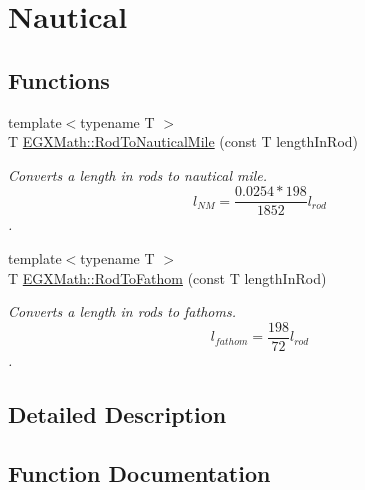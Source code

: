 \hypertarget{group___e_g_x_math-_conversions-_length_conversions-_imperial-_rod-_nautical}{}\section{Nautical}
\label{group___e_g_x_math-_conversions-_length_conversions-_imperial-_rod-_nautical}
\subsection*{Functions}
\begin{DoxyCompactItemize}
\item 
{\footnotesize template$<$typename T $>$ }\\T \mbox{\hyperlink{group___e_g_x_math-_conversions-_length_conversions-_imperial-_rod-_nautical_ga68825640131c61e55490acfcb616aa78}{E\+G\+X\+Math\+::\+Rod\+To\+Nautical\+Mile}} (const T length\+In\+Rod)
\begin{DoxyCompactList}\small\item\em Converts a length in rods to nautical mile. \[ l_{NM}= \frac{0.0254 * 198}{1852} l_{rod} \]. \end{DoxyCompactList}\item 
{\footnotesize template$<$typename T $>$ }\\T \mbox{\hyperlink{group___e_g_x_math-_conversions-_length_conversions-_imperial-_rod-_nautical_gaf0e4a1c1d7f8d23f57c1c2df8a617c7c}{E\+G\+X\+Math\+::\+Rod\+To\+Fathom}} (const T length\+In\+Rod)
\begin{DoxyCompactList}\small\item\em Converts a length in rods to fathoms. \[ l_{fathom}= \frac{198}{72} l_{rod} \]. \end{DoxyCompactList}\end{DoxyCompactItemize}


\subsection{Detailed Description}


\subsection{Function Documentation}
\mbox{\label{group___e_g_x_math-_conversions-_length_conversions-_imperial-_rod-_nautical_gaf0e4a1c1d7f8d23f57c1c2df8a617c7c}} 
